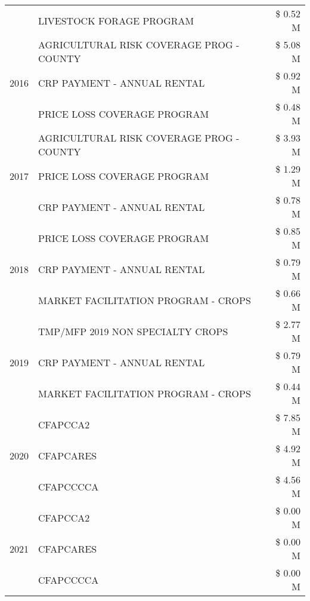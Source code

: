 \begin{tabular}{llr}
 & LIVESTOCK FORAGE PROGRAM & \$ 0.52 M \\
\cline{1-3}
\multirow[t]{3}{*}{2016} & AGRICULTURAL RISK COVERAGE PROG - COUNTY & \$ 5.08 M \\
 & CRP PAYMENT - ANNUAL RENTAL & \$ 0.92 M \\
 & PRICE LOSS COVERAGE PROGRAM & \$ 0.48 M \\
\cline{1-3}
\multirow[t]{3}{*}{2017} & AGRICULTURAL RISK COVERAGE PROG - COUNTY & \$ 3.93 M \\
 & PRICE LOSS COVERAGE PROGRAM & \$ 1.29 M \\
 & CRP PAYMENT - ANNUAL RENTAL & \$ 0.78 M \\
\cline{1-3}
\multirow[t]{3}{*}{2018} & PRICE LOSS COVERAGE PROGRAM & \$ 0.85 M \\
 & CRP PAYMENT - ANNUAL RENTAL & \$ 0.79 M \\
 & MARKET FACILITATION PROGRAM - CROPS & \$ 0.66 M \\
\cline{1-3}
\multirow[t]{3}{*}{2019} & TMP/MFP 2019 NON SPECIALTY CROPS & \$ 2.77 M \\
 & CRP PAYMENT - ANNUAL RENTAL & \$ 0.79 M \\
 & MARKET FACILITATION PROGRAM - CROPS & \$ 0.44 M \\
\cline{1-3}
\multirow[t]{3}{*}{2020} & CFAPCCA2 & \$ 7.85 M \\
 & CFAPCARES & \$ 4.92 M \\
 & CFAPCCCCA & \$ 4.56 M \\
\cline{1-3}
\multirow[t]{3}{*}{2021} & CFAPCCA2 & \$ 0.00 M \\
 & CFAPCARES & \$ 0.00 M \\
 & CFAPCCCCA & \$ 0.00 M \\
\cline{1-3}
\bottomrule
\end{tabular}
